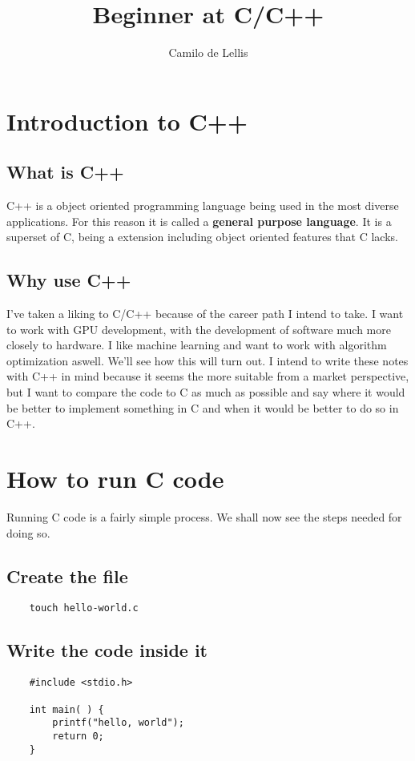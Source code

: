 \documentclass{article}
\title{Beginner at C/C++}
\author{Camilo de Lellis}
\begin{document}
\maketitle
\tableofcontents

\section{Introduction to C++}

\subsection{What is C++}
C++ is a object oriented programming language being used in the most diverse applications. For this reason it is called a \textbf{general purpose language}. It is a superset of C, being a extension including object oriented features that C lacks.

\subsection{Why use C++}
I've taken a liking to C/C++ because of the career path I intend to take. I want to work with GPU development, with the development of software much more closely to hardware. I like machine learning and want to work with algorithm optimization aswell. We'll see how this will turn out. I intend to write these notes with C++ in mind because it seems the more suitable from a market perspective, but I want to compare the code to C as much as possible and say where it would be better to implement something in C and when it would be better to do so in C++.

\section{How to run C code}
Running C code is a fairly simple process. We shall now see the steps needed for doing so.

\subsection{Create the file}
\begin{verbatim}
    touch hello-world.c
\end{verbatim}

\subsection{Write the code inside it}
\begin{verbatim}
    #include <stdio.h>

    int main( ) {
        printf("hello, world");
        return 0;
    }
\end{verbatim}
\end{document}
